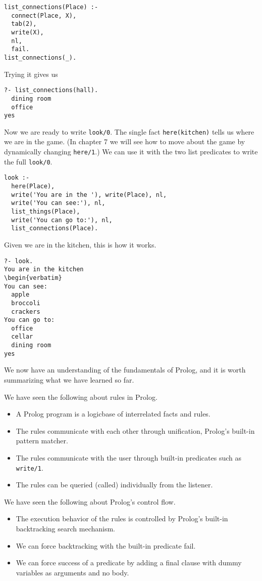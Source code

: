 \begin{verbatim}
list_connections(Place) :-
  connect(Place, X),
  tab(2),
  write(X),
  nl,
  fail.
list_connections(_).
\end{verbatim}
Trying it gives us

\begin{verbatim}
?- list_connections(hall).
  dining room
  office
yes
\end{verbatim}
Now we are ready to write \verb'look/0'. The single fact \verb'here(kitchen)'
tells us where we are in the game. (In chapter 7 we will see how to move about
the game by dynamically changing \verb'here/1'.) We can use it with the two list
predicates to write the full \verb'look/0'.

\begin{verbatim}
look :-
  here(Place),
  write('You are in the '), write(Place), nl,
  write('You can see:'), nl,
  list_things(Place),
  write('You can go to:'), nl,
  list_connections(Place).
\end{verbatim}
Given we are in the kitchen, this is how it works.

\begin{verbatim}
?- look.
You are in the kitchen
\begin{verbatim}
You can see:
  apple
  broccoli
  crackers
You can go to:
  office
  cellar
  dining room
yes
\end{verbatim}
We now have an understanding of the fundamentals of Prolog, and it is worth
summarizing what we have learned so far. 

We have seen the following about rules
in Prolog.
\begin{itemize}
  \item 
A Prolog program is a logicbase of interrelated facts and rules.
  \item 
The rules communicate with each other through unification, Prolog's built-in
pattern matcher.
  \item 
The rules communicate with the user through built-in predicates such as
\verb'write/1'.
  \item 
The rules can be queried (called) individually from the listener.
\end{itemize}

We have seen the following about Prolog's control flow.
\begin{itemize}
  \item 
The execution behavior of the rules is controlled by Prolog's built-in backtracking search mechanism.
  \item 
We can force backtracking with the built-in predicate fail.
  \item 
We can force success of a predicate by adding a final clause with dummy variables as arguments and no body.
\end{itemize}

